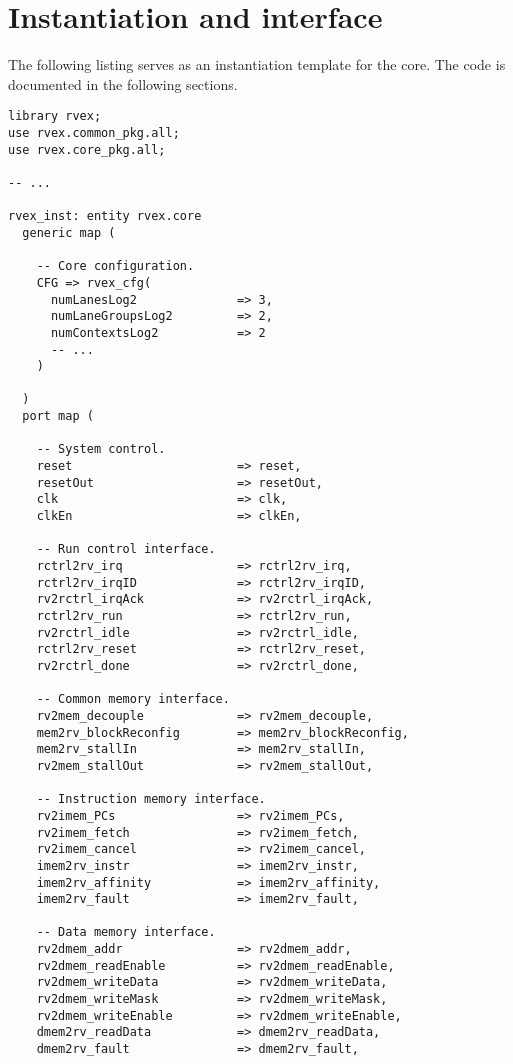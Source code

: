 \documentclass[main.tex]{subfiles}
\begin{document}
\section{Instantiation and interface}

The following listing serves as an instantiation template for the core. The code is documented in the following sections.

\begin{lstlisting}[numbers=none, basicstyle=\tiny]
library rvex;
use rvex.common_pkg.all;
use rvex.core_pkg.all;

-- ...

rvex_inst: entity rvex.core
  generic map (
    
    -- Core configuration.
    CFG => rvex_cfg(
      numLanesLog2              => 3,
      numLaneGroupsLog2         => 2,
      numContextsLog2           => 2
      -- ...
    )
    
  )
  port map (
    
    -- System control.
    reset                       => reset,
    resetOut                    => resetOut,
    clk                         => clk,
    clkEn                       => clkEn,
    
    -- Run control interface.
    rctrl2rv_irq                => rctrl2rv_irq,
    rctrl2rv_irqID              => rctrl2rv_irqID,
    rv2rctrl_irqAck             => rv2rctrl_irqAck,
    rctrl2rv_run                => rctrl2rv_run,
    rv2rctrl_idle               => rv2rctrl_idle,
    rctrl2rv_reset              => rctrl2rv_reset,
    rv2rctrl_done               => rv2rctrl_done,
    
    -- Common memory interface.
    rv2mem_decouple             => rv2mem_decouple,
    mem2rv_blockReconfig        => mem2rv_blockReconfig,
    mem2rv_stallIn              => mem2rv_stallIn,
    rv2mem_stallOut             => rv2mem_stallOut,
    
    -- Instruction memory interface.
    rv2imem_PCs                 => rv2imem_PCs,
    rv2imem_fetch               => rv2imem_fetch,
    rv2imem_cancel              => rv2imem_cancel,
    imem2rv_instr               => imem2rv_instr,
    imem2rv_affinity            => imem2rv_affinity,
    imem2rv_fault               => imem2rv_fault,
    
    -- Data memory interface.
    rv2dmem_addr                => rv2dmem_addr,
    rv2dmem_readEnable          => rv2dmem_readEnable,
    rv2dmem_writeData           => rv2dmem_writeData,
    rv2dmem_writeMask           => rv2dmem_writeMask,
    rv2dmem_writeEnable         => rv2dmem_writeEnable,
    dmem2rv_readData            => dmem2rv_readData,
    dmem2rv_fault               => dmem2rv_fault,
    

\end{lstlisting}
\end{document}
